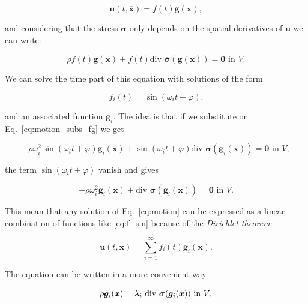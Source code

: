 \documentclass[review]{elsarticle}
\begin{document}
\begin{equation}
\bm{u}(t,\overline{\bm{x}}) = f(t) \bm{g}(\bm{x}),
\label{eq:u_fg}
\end{equation}

\noindent
and considering that the stress $\bm{\sigma}$ only depends on the
spatial derivatives of $\bm{u}$ we can write:

\begin{equation}
\rho \ddot{f}(t) \bm{g}(\bm{x}) +
f(t) \text{div } \overline{\bm{\sigma}}(\bm{g}(\bm{x}))
= \bm{0} \text{ in } V.
\label{eq:motion_subs_fg}
\end{equation}

We can solve the time part of this equation with solutions of the form

\begin{equation}
f_i(t) = \sin (\omega_i t + \varphi).
\label{eq:f_sin}
\end{equation}

\noindent
and an associated function $\bm{g}_i$. The idea is that if we substitute 
on Eq.~\ref{eq:motion_subs_fg} we get

\begin{equation}
- \rho \omega_i^2 \sin (\omega_i t + \varphi) \bm{g}_i(\bm{x}) +
\sin (\omega_i t + \varphi) \text{div } \bm{\sigma}(\bm{g}_i(\bm{x})) 
= \bm{0} \text{ in } V,
\label{eq:motion}
\end{equation}

\noindent
the term $\sin (\omega_i t + \varphi)$ vanish and gives

\begin{equation}
- \rho \omega_i^2 \bm{g}_i(\bm{x}) +
\text{div } \bm{\sigma}(\bm{g}_i(\bm{x})) 
= \bm{0} \text{ in } V.
\label{eq:motion}
\end{equation}

This mean that any solution of Eq.~\ref{eq:motion} can be expressed as a linear
combination of functions like \ref{eq:f_sin} because of the \emph{Dirichlet
theorem}:

\begin{equation}
\bm{u}(t,\bm{x}) = \sum_{i=1}^{\infty} f_i(t)
\bm{g}_i(\bm{x}).
\label{eq:dir_teo}
\end{equation}

The equation can be written in a more convenient way

\begin{equation}
\rho \bm{g}_i(\bm{x}) = 
\lambda_i  \text{ div } \bm{\sigma}(\bm{g}_i(\bm{x})) 
\text{ in } V,\\
\label{eq:motion}
\end{equation}
\end{document}
